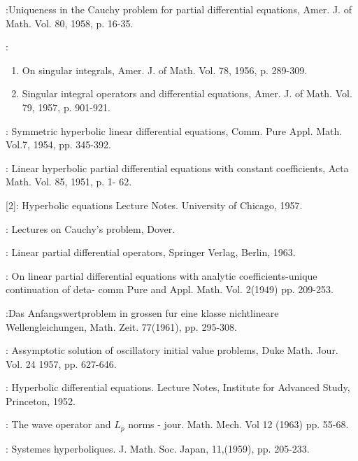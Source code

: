 \begin{thebibliography}{99}
:\pageoriginale Uniqueness in the
  Cauchy problem for 
  partial differential equations, Amer. J. of Math. Vol. 80, 1958,
  p. 16-35. 

 :
\begin{enumerate}
 \item On singular  integrals, Amer. J. of Math. Vol. 78, 1956,
   p. 289-309. 

 \item Singular integral operators and differential equations,
   Amer. J. of Math. Vol. 79, 1957, p. 901-921. 
 \end{enumerate}

  : Symmetric hyperbolic linear
   differential equations, Comm. Pure Appl. Math. Vol.7, 1954,
   pp. 345-392.  

  : Linear hyperbolic partial differential
   equations with  constant coefficients, Acta Math. Vol. 85, 1951,
   p. 1- 62. 

{[2]}: Hyperbolic equations Lecture Notes. University of
   Chicago, 1957. 

  : Lectures on Cauchy's problem, Dover. 

 : Linear partial differential operators,
   Springer Verlag, Berlin, 1963. 

  : On linear partial differential equations
   with analytic coefficients-unique continuation of deta- comm Pure
   and Appl. Math. Vol. 2(1949) pp. 209-253. 

  :\pageoriginale Das
   Anfangswertproblem in grossen fur 
   eine klasse nichtlineare Wellengleichungen, Math. Zeit. 77(1961),
   pp. 295-308. 

  : Assymptotic solution of oscillatory initial
   value problems, Duke Math. Jour. Vol. 24 1957, pp. 627-646. 

  : Hyperbolic differential
   equations. Lecture Notes, Institute for Advanced Study, Princeton,
   1952. 

  : The wave operator and $L_p$  norms -
   jour. Math. Mech. Vol 12 (1963) pp. 55-68. 

  : Systemes
   hyperboliques. J. Math. Soc. Japan, 11,(1959), pp. 205-233. 


\end{thebibliography}

